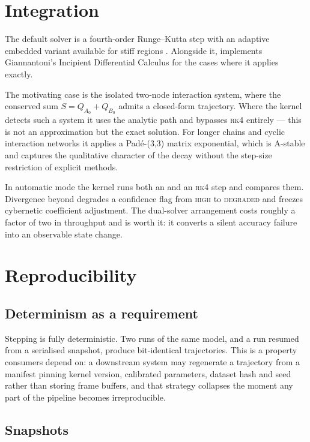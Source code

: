\documentclass[11pt,a4paper]{article}
\begin{document}
\section{Integration}

The default solver is a fourth-order Runge--Kutta step with an adaptive embedded variant available for stiff regions \citep{dormand1980}. Alongside it, \gssk{} implements Giannantoni's Incipient Differential Calculus \citep{giannantoni2006} for the cases where it applies exactly.

The motivating case is the isolated two-node interaction system, where the conserved sum $S = Q_{A_0} + Q_{B_0}$ admits a closed-form trajectory. Where the kernel detects such a system it uses the analytic path and bypasses \textsc{rk4} entirely --- this is not an approximation but the exact solution. For longer chains and cyclic interaction networks it applies a Padé-(3,3) matrix exponential, which is A-stable and captures the qualitative character of the decay without the step-size restriction of explicit methods.

In automatic mode the kernel runs both an \idc{} and an \textsc{rk4} step and compares them. Divergence beyond  degrades a confidence flag from \textsc{high} to \textsc{degraded} and freezes cybernetic coefficient adjustment. The dual-solver arrangement costs roughly a factor of two in throughput and is worth it: it converts a silent accuracy failure into an observable state change.

\section{Reproducibility}

\subsection{Determinism as a requirement}

Stepping is fully deterministic. Two runs of the same model, and a run resumed from a serialised snapshot, produce bit-identical trajectories. This is a property consumers depend on: a downstream system may regenerate a trajectory from a manifest pinning kernel version, calibrated parameters, dataset hash and seed rather than storing frame buffers, and that strategy collapses the moment any part of the pipeline becomes irreproducible.

\subsection{Snapshots}
\end{document}
